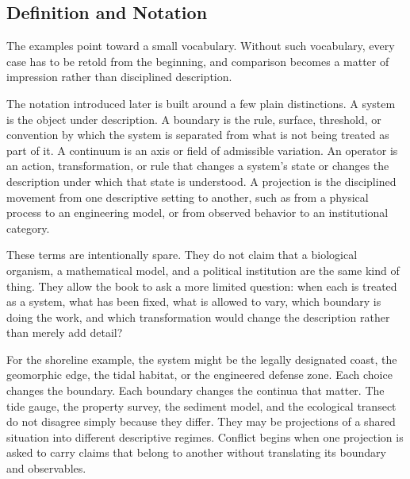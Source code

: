 \documentclass[11pt,a4paper,openany]{book}
\begin{document}
\subsection{Definition and Notation}
The examples point toward a small vocabulary. Without such vocabulary, every case has to be retold from the beginning, and comparison becomes a matter of impression rather than disciplined description. \cite{grimmett_percolation,goldenfeld_lectures}\par
The notation introduced later is built around a few plain distinctions. A system is the object under description. A boundary is the rule, surface, threshold, or convention by which the system is separated from what is not being treated as part of it. A continuum is an axis or field of admissible variation. An operator is an action, transformation, or rule that changes a system's state or changes the description under which that state is understood. A projection is the disciplined movement from one descriptive setting to another, such as from a physical process to an engineering model, or from observed behavior to an institutional category.\par
These terms are intentionally spare. They do not claim that a biological organism, a mathematical model, and a political institution are the same kind of thing. They allow the book to ask a more limited question: when each is treated as a system, what has been fixed, what is allowed to vary, which boundary is doing the work, and which transformation would change the description rather than merely add detail?\par
For the shoreline example, the system might be the legally designated coast, the geomorphic edge, the tidal habitat, or the engineered defense zone. Each choice changes the boundary. Each boundary changes the continua that matter. The tide gauge, the property survey, the sediment model, and the ecological transect do not disagree simply because they differ. They may be projections of a shared situation into different descriptive regimes. Conflict begins when one projection is asked to carry claims that belong to another without translating its boundary and observables.\par
\end{document}
